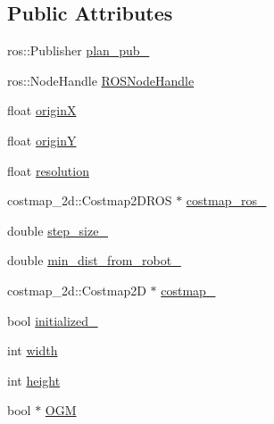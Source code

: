 \subsection*{Public Attributes}
\begin{DoxyCompactItemize}
\item 
ros\-::\-Publisher \hyperlink{classRAstar__planner_1_1RAstarPlannerROS_a53d1415cf583098e3e9444d6258e1677}{plan\-\_\-pub\-\_\-}
\item 
ros\-::\-Node\-Handle \hyperlink{classRAstar__planner_1_1RAstarPlannerROS_a7371972d6a02e857f3640b795c5ef11c}{R\-O\-S\-Node\-Handle}
\item 
float \hyperlink{classRAstar__planner_1_1RAstarPlannerROS_ad2259dddb7800340bc6d5f89ebc4186b}{origin\-X}
\item 
float \hyperlink{classRAstar__planner_1_1RAstarPlannerROS_a94427d193482b1c34b3db7ae2bfb8155}{origin\-Y}
\item 
float \hyperlink{classRAstar__planner_1_1RAstarPlannerROS_a651c37170c82d3b116961a9ba1ccea6e}{resolution}
\item 
costmap\-\_\-2d\-::\-Costmap2\-D\-R\-O\-S $\ast$ \hyperlink{classRAstar__planner_1_1RAstarPlannerROS_a7bec96cd0f94ecb17f98e206e46e461b}{costmap\-\_\-ros\-\_\-}
\item 
double \hyperlink{classRAstar__planner_1_1RAstarPlannerROS_ab9efb9a5f82f7c82c91f438c05a22c91}{step\-\_\-size\-\_\-}
\item 
double \hyperlink{classRAstar__planner_1_1RAstarPlannerROS_a0dc442aa982d3fdedb8dbbc22b28a470}{min\-\_\-dist\-\_\-from\-\_\-robot\-\_\-}
\item 
costmap\-\_\-2d\-::\-Costmap2\-D $\ast$ \hyperlink{classRAstar__planner_1_1RAstarPlannerROS_a8e9d61f1082f16a9bedb7f038fa090ed}{costmap\-\_\-}
\item 
bool \hyperlink{classRAstar__planner_1_1RAstarPlannerROS_a01c6678d519c4f7667747ea21dccd8ba}{initialized\-\_\-}
\item 
int \hyperlink{classRAstar__planner_1_1RAstarPlannerROS_accbb5d01b9d9630eb906c71fb255dd0d}{width}
\item 
int \hyperlink{classRAstar__planner_1_1RAstarPlannerROS_ab200f89722ca863dff4daf8ea25fd910}{height}
\item 
bool $\ast$ \hyperlink{classRAstar__planner_1_1RAstarPlannerROS_a873e16d6355ad94a276f4795bb450141}{O\-G\-M}
\end{DoxyCompactItemize}


